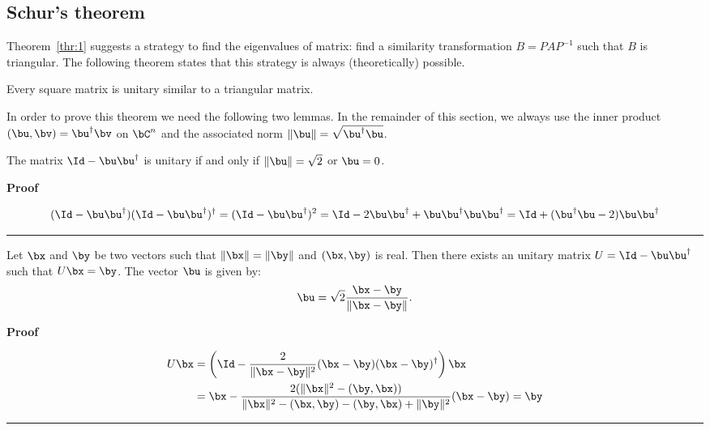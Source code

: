 \subsection{Schur's theorem}

Theorem~\ref{thr:1} suggests a strategy to find the eigenvalues of
matrix: find a similarity transformation $B = P A P^{-1}$ such that
$B$ is triangular.  The following theorem states that this strategy is
always (theoretically) possible.

\begin{theorem}[Schur]
  Every square matrix is unitary similar to a triangular matrix.
\end{theorem}

\noindent
In order to prove this theorem we need the following two lemmas. In
the remainder of this section, we always use the inner product
$(\bu,\bv)=\bu^\dagger\bv$ on $\bC^n$ and the associated norm
$\|\bu\|=\sqrt{\bu^\dagger\bu}$.

\begin{lemma}
  \label{ax:1}
  The matrix $\Id - \bu \bu^{\dagger}$ is unitary if and only if
  $\|\bu\| = \sqrt{2}$ or $\bu=0$.
\end{lemma}
\noindent
\textbf{Proof}

\begin{equation*}
  (\Id - \bu \bu^{\dagger})(\Id - \bu \bu^{\dagger})^\dagger
  = (\Id - \bu \bu^{\dagger})^2 = \Id - 2 \bu \bu^{\dagger}
  + \bu \bu^{\dagger} \bu \bu^{\dagger}
  = \Id +(\bu^{\dagger} \bu - 2) \bu \bu^{\dagger}
\end{equation*}
\null \hfill \rule{3mm}{3mm}

\begin{lemma}
  \label{ax:2}
  Let $\bx$ and $\by$ be two vectors such that $\|\bx\| = \|\by\|$ and
  $(\bx,\by)$ is real.  Then there exists an unitary matrix $U = \Id -
  \bu \bu^{\dagger}$ such that $U \bx = \by$.  The vector $\bu$ is
  given by:
  \begin{equation*}
    \bu = \sqrt{2} \frac{\bx - \by}{\|\bx - \by\|} .
  \end{equation*}
\end{lemma}
\noindent
\textbf{Proof}

\begin{align*}
  U \bx &= \left(\Id - \frac{2}{\|\bx - \by\|^2}(\bx - \by)(\bx - \by)^\dagger
  \right) \bx \\
  &= \bx - \frac{2 (\|\bx\|^2 - (\by,\bx))}{
    \|\bx\|^2 - (\bx,\by) - (\by,\bx) + \|\by\|^2} (\bx - \by) = \by
\end{align*}
\null \hfill \rule{3mm}{3mm}

